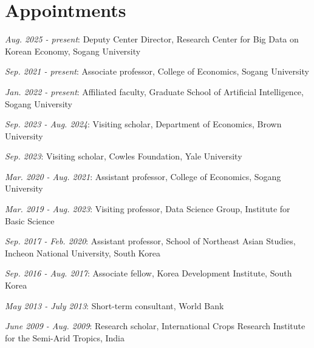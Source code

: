 \documentclass[a4paper,12pt]{article}
\renewenvironment{itemize}{
  \begin{list}{}{
    \setlength{\leftmargin}{1.5em}
  }
}{
  \end{list}
}
\begin{document}
\section*{Appointments}
\begin{itemize}
\item \textit{Aug. 2025 -  present}: Deputy Center Director, Research Center for Big Data on Korean Economy, Sogang University
\item \textit{Sep. 2021 -  present}: Associate professor, College of Economics, Sogang University
\item \textit{Jan. 2022 - present}: Affiliated faculty, Graduate School of Artificial Intelligence, Sogang University
\item \textit{Sep. 2023 -  Aug. 2024}: Visiting scholar, Department of Economics, Brown University
\item \textit{Sep. 2023}: Visiting scholar, Cowles Foundation, Yale University
\item \textit{Mar. 2020 -  Aug. 2021}: Assistant professor, College of Economics, Sogang University
\item \textit{Mar. 2019 - Aug. 2023}: Visiting professor, Data Science Group, Institute for Basic Science
\item \textit{Sep. 2017 - Feb. 2020}: Assistant professor, School of Northeast Asian Studies, Incheon National University, South Korea
\item \textit{Sep. 2016 - Aug. 2017}: Associate fellow, Korea Development Institute, South Korea
\item \textit{May 2013 - July 2013}: Short-term consultant, World Bank
\item \textit{June 2009 - Aug. 2009}: Research scholar, International Crops Research Institute for the Semi-Arid Tropics, India
\end{itemize}


\end{document}

